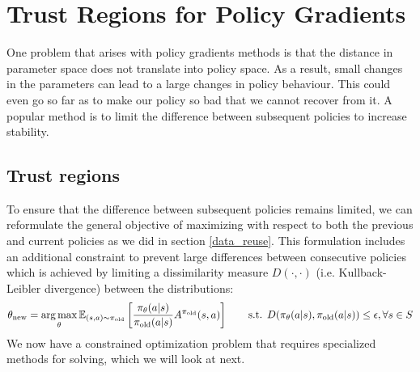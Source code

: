 \section{Trust Regions for Policy Gradients }
One problem that arises with policy gradients methods is that the distance in 
parameter space does not translate into policy space. As a result, small changes in 
the parameters can lead to a large changes in policy behaviour. This could even go 
so far as to make our policy so bad that we cannot recover from it. A popular method 
is to limit the difference between subsequent policies to increase stability.

\subsection{Trust regions}
To ensure that the difference between subsequent policies remains limited, we can reformulate the general
objective of maximizing with respect to both the previous and current policies as we did in section \ref{data_reuse}.
This formulation includes an additional constraint to prevent large differences between consecutive policies which 
is achieved by limiting a dissimilarity measure  $D(\cdot,\cdot)$ (i.e. Kullback-Leibler divergence) between the distributions:
\begin{gather*}
\theta_{\text{new}} = \operatorname*{arg\,max}\limits_\theta \mathbb{E}_{(s,a)\sim \pi_{\text{old}}}\left[\frac{\pi_{\theta}(a|s)}{\pi_{\text{old}}(a|s)} A^{\pi_{\text{old}}}(s,a)\right] \qquad  
\text{s.t. } D(\pi_\theta(a|s),\pi_{\text{old}}(a|s)) \leq \epsilon, \forall s \in S
\end{gather*}
We now have a constrained optimization problem that requires specialized methods for solving, which we will look at next.

